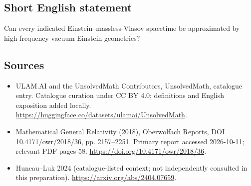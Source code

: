 \documentclass[11pt]{article}
\begin{document}
\subsection{Short English statement}
Can every indicated Einstein--massless-Vlasov spacetime be approximated by high-frequency vacuum Einstein geometries?
\subsection{Sources}
\begin{itemize}
\item[\hypertarget{source:statement:1}{S1}] ULAM.AI and the UnsolvedMath Contributors, UnsolvedMath, catalogue entry. Catalogue curation under CC BY 4.0; definitions and English exposition added locally.
\url{https://huggingface.co/datasets/ulamai/UnsolvedMath}.
\item[\hypertarget{source:statement:2}{S2}] Mathematical General Relativity (2018), Oberwolfach Reports, DOI 10.4171/owr/2018/36, pp. 2157--2251. Primary report accessed 2026-10-11; relevant PDF pages 58.
\url{https://doi.org/10.4171/owr/2018/36}.
\item[\hypertarget{source:statement:3}{S3}] Huneau--Luk 2024 (catalogue-listed context; not independently consulted in this preparation).
\url{https://arxiv.org/abs/2404.07659}.
\end{itemize}
\label{end:statement}
\end{document}
